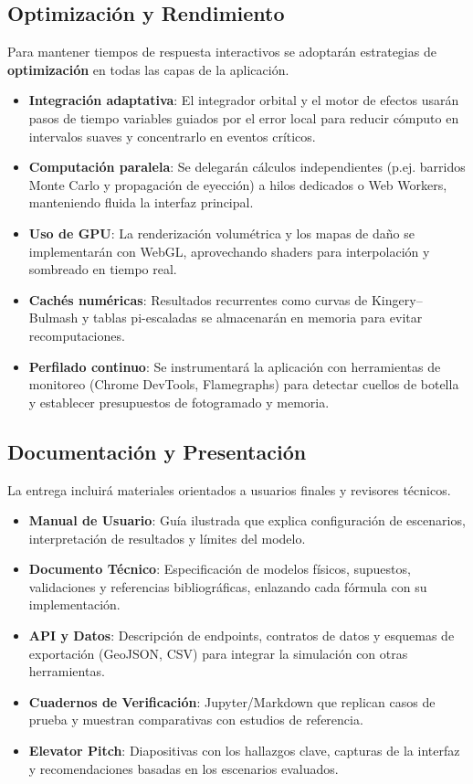 \documentclass[conference]{IEEEtran}
\begin{document}
\subsection{Optimización y Rendimiento}
Para mantener tiempos de respuesta interactivos se adoptarán estrategias de
\textbf{optimización} en todas las capas de la aplicación.
\begin{itemize}
	\item \textbf{Integración adaptativa}: El integrador orbital y el motor de
	      efectos usarán pasos de tiempo variables guiados por el error local para
	      reducir cómputo en intervalos suaves y concentrarlo en eventos críticos.
	\item \textbf{Computación paralela}: Se delegarán cálculos independientes (p.ej.
	      barridos Monte Carlo y propagación de eyección) a hilos dedicados o Web
	      Workers, manteniendo fluida la interfaz principal.
	\item \textbf{Uso de GPU}: La renderización volumétrica y los mapas de daño se
	      implementarán con WebGL, aprovechando shaders para interpolación y
	      sombreado en tiempo real.
	\item \textbf{Cachés numéricas}: Resultados recurrentes como curvas de
	      Kingery--Bulmash y tablas pi-escaladas se almacenarán en memoria para
	      evitar recomputaciones.
	\item \textbf{Perfilado continuo}: Se instrumentará la aplicación con
	      herramientas de monitoreo (Chrome DevTools, Flamegraphs) para detectar
	      cuellos de botella y establecer presupuestos de fotogramado y memoria.
\end{itemize}

\subsection{Documentación y Presentación}
La entrega incluirá materiales orientados a usuarios finales y revisores
técnicos.
\begin{itemize}
	\item \textbf{Manual de Usuario}: Guía ilustrada que explica configuración de
	      escenarios, interpretación de resultados y límites del modelo.
	\item \textbf{Documento Técnico}: Especificación de modelos físicos,
	      supuestos, validaciones y referencias bibliográficas, enlazando cada
	      fórmula con su implementación.
	\item \textbf{API y Datos}: Descripción de endpoints, contratos de datos y
	      esquemas de exportación (GeoJSON, CSV) para integrar la simulación con
	      otras herramientas.
	\item \textbf{Cuadernos de Verificación}: Jupyter/Markdown que replican casos
	      de prueba y muestran comparativas con estudios de referencia.
	\item \textbf{Elevator Pitch}: Diapositivas con los hallazgos clave,
	      capturas de la interfaz y recomendaciones basadas en los escenarios
	      evaluados.
\end{itemize}
\end{document}

